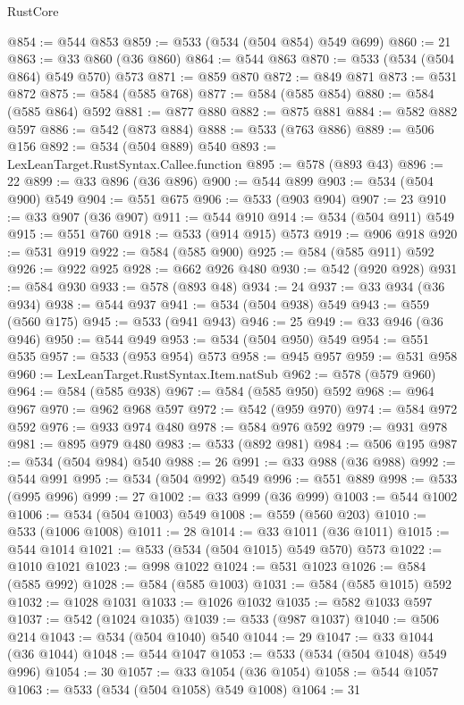 \begin{lexlean}{RustCore}
\begin{coremodule}
@854 := @544 @853
@859 := @533 (@534 (@504 @854) @549 @699)
@860 := 21
@863 := @33 @860 (@36 @860)
@864 := @544 @863
@870 := @533 (@534 (@504 @864) @549 @570) @573
@871 := @859 @870
@872 := @849 @871
@873 := @531 @872
@875 := @584 (@585 @768)
@877 := @584 (@585 @854)
@880 := @584 (@585 @864) @592
@881 := @877 @880
@882 := @875 @881
@884 := @582 @882 @597
@886 := @542 (@873 @884)
@888 := @533 (@763 @886)
@889 := @506 @156
@892 := @534 (@504 @889) @540
@893 := LexLeanTarget.RustSyntax.Callee.function
@895 := @578 (@893 @43)
@896 := 22
@899 := @33 @896 (@36 @896)
@900 := @544 @899
@903 := @534 (@504 @900) @549
@904 := @551 @675
@906 := @533 (@903 @904)
@907 := 23
@910 := @33 @907 (@36 @907)
@911 := @544 @910
@914 := @534 (@504 @911) @549
@915 := @551 @760
@918 := @533 (@914 @915) @573
@919 := @906 @918
@920 := @531 @919
@922 := @584 (@585 @900)
@925 := @584 (@585 @911) @592
@926 := @922 @925
@928 := @662 @926 @480
@930 := @542 (@920 @928)
@931 := @584 @930
@933 := @578 (@893 @48)
@934 := 24
@937 := @33 @934 (@36 @934)
@938 := @544 @937
@941 := @534 (@504 @938) @549
@943 := @559 (@560 @175)
@945 := @533 (@941 @943)
@946 := 25
@949 := @33 @946 (@36 @946)
@950 := @544 @949
@953 := @534 (@504 @950) @549
@954 := @551 @535
@957 := @533 (@953 @954) @573
@958 := @945 @957
@959 := @531 @958
@960 := LexLeanTarget.RustSyntax.Item.natSub
@962 := @578 (@579 @960)
@964 := @584 (@585 @938)
@967 := @584 (@585 @950) @592
@968 := @964 @967
@970 := @962 @968 @597
@972 := @542 (@959 @970)
@974 := @584 @972 @592
@976 := @933 @974 @480
@978 := @584 @976 @592
@979 := @931 @978
@981 := @895 @979 @480
@983 := @533 (@892 @981)
@984 := @506 @195
@987 := @534 (@504 @984) @540
@988 := 26
@991 := @33 @988 (@36 @988)
@992 := @544 @991
@995 := @534 (@504 @992) @549
@996 := @551 @889
@998 := @533 (@995 @996)
@999 := 27
@1002 := @33 @999 (@36 @999)
@1003 := @544 @1002
@1006 := @534 (@504 @1003) @549
@1008 := @559 (@560 @203)
@1010 := @533 (@1006 @1008)
@1011 := 28
@1014 := @33 @1011 (@36 @1011)
@1015 := @544 @1014
@1021 := @533 (@534 (@504 @1015) @549 @570) @573
@1022 := @1010 @1021
@1023 := @998 @1022
@1024 := @531 @1023
@1026 := @584 (@585 @992)
@1028 := @584 (@585 @1003)
@1031 := @584 (@585 @1015) @592
@1032 := @1028 @1031
@1033 := @1026 @1032
@1035 := @582 @1033 @597
@1037 := @542 (@1024 @1035)
@1039 := @533 (@987 @1037)
@1040 := @506 @214
@1043 := @534 (@504 @1040) @540
@1044 := 29
@1047 := @33 @1044 (@36 @1044)
@1048 := @544 @1047
@1053 := @533 (@534 (@504 @1048) @549 @996)
@1054 := 30
@1057 := @33 @1054 (@36 @1054)
@1058 := @544 @1057
@1063 := @533 (@534 (@504 @1058) @549 @1008)
@1064 := 31

\end{coremodule}
\end{lexlean}
